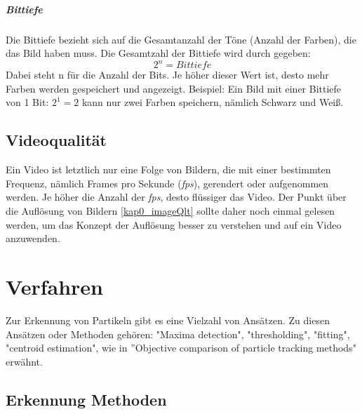 \subparagraph{Bittiefe\\}
Die Bittiefe bezieht sich auf die Gesamtanzahl der Töne (Anzahl der Farben), die das Bild haben muss.  Die Gesamtzahl der Bittiefe wird durch gegeben:
\begin{equation}
	2^n = Bittiefe
\end{equation}   Dabei steht n für die Anzahl der Bits.
Je höher dieser Wert ist, desto mehr Farben werden gespeichert und angezeigt. Beispiel: Ein Bild mit einer Bittiefe von 1 Bit: $2^1=2$ kann nur zwei Farben speichern, nämlich Schwarz und Weiß.


\subsection{Videoqualität \label{kap0_videoQlt}}

Ein Video ist letztlich nur eine Folge von Bildern, die mit einer bestimmten Frequenz, nämlich Frames pro Sekunde (\textit{fps}), gerendert oder aufgenommen werden.
Je höher die Anzahl der \textit{fps}, desto flüssiger das Video.
Der Punkt über die Auflösung von Bildern \ref{kap0_imageQlt} sollte daher noch einmal gelesen werden, um das Konzept der Auflösung besser zu verstehen und auf ein Video anzuwenden.

\section{Verfahren  \label{kap0_verf}}
Zur Erkennung von Partikeln gibt es eine Vielzahl von Ansätzen. Zu diesen Ansätzen oder Methoden gehören: "Maxima detection", "thresholding", "fitting", "centroid estimation", wie in ''Objective comparison of particle tracking methods" erwähnt.
\subsection{Erkennung Methoden \label{kap0_verf_erkenn}}



